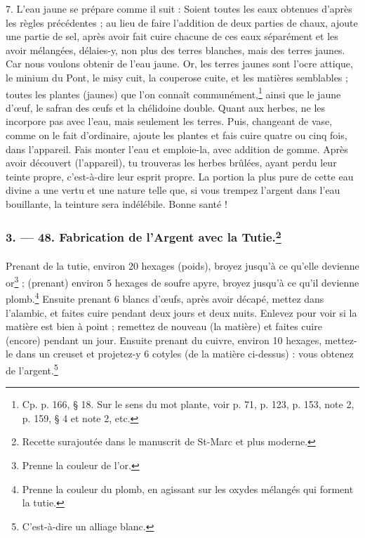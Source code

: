 \documentclass[a4paper, 11pt, oneside, polutonikogreek, french]{article}
\begin{document}
7. L'eau jaune se prépare comme il suit : Soient toutes les eaux obtenues d'après les règles précédentes ; au lieu de faire l'addition de deux parties de chaux, ajoute une partie de sel, après avoir fait cuire chacune de ces eaux séparément et les avoir mélangées, délaies-y, non plus des terres blanches, mais des terres jaunes. Car nous voulons obtenir de l'eau jaune. Or, les terres jaunes sont l'ocre attique, le minium du Pont, le misy cuit, la couperose cuite, et les matières semblables ; toutes les plantes (jaunes) que l'on connaît communément,\footnote{Cp. p. 166, § 18. Sur le sens du mot plante, voir p. 71, p. 123, p. 153, note 2, p. 159, § 4 et note 2, etc.} ainsi que le jaune d'œuf, le safran des œufs et la chélidoine double. Quant aux herbes, ne les incorpore pas avec l'eau, mais seulement les terres. Puis, changeant de vase, comme on le fait d'ordinaire, ajoute les plantes et fais cuire quatre ou cinq fois, dans l'appareil. Fais monter l'eau et emploie-la, avec addition de gomme. Après avoir découvert (l'appareil), tu trouveras les herbes brûlées, ayant perdu leur teinte propre, c'est-à-dire leur esprit propre. La portion la plus pure de cette eau divine a une vertu et une nature telle que, si vous trempez l'argent dans l'eau bouillante, la teinture sera indélébile. Bonne santé !

\bigskip
\centerline{\EightStarTaper}
\centerline{\EightStarTaper\EightStarTaper}
\bigskip

\subsubsection[3. --- 48. Fabrication de l'Argent avec la Tutie.]{3. --- 48. Fabrication de l'Argent avec la Tutie.\footnote{Recette surajoutée dans le manuscrit de St-Marc et plus moderne.}}
\paragraph{}
Prenant de la tutie, environ 20 hexages (poids), broyez jusqu'à ce qu'elle devienne or\footnote{Prenne la couleur de l'or.} ; (prenant) environ 5 hexages de soufre apyre, broyez jusqu'à ce qu'il devienne plomb.\footnote{Prenne la couleur du plomb, en agissant sur les oxydes mélangés qui forment la tutie.} Ensuite prenant 6 blancs d'œufs, après avoir décapé, mettez dans l'alambic, et faites cuire pendant deux jours et deux nuits. Enlevez pour voir si la matière est bien à point ; remettez de nouveau (la matière) et faites cuire (encore) pendant un jour. Ensuite prenant du cuivre, environ 10 hexages, mettez-le dans un creuset et projetez-y 6 cotyles (de la matière ci-dessus) : vous obtenez de l'argent.\footnote{C'est-à-dire un alliage blanc.}
\end{document}
